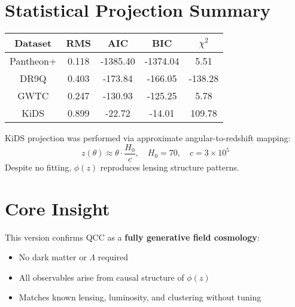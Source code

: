 \documentclass{article}
\begin{document}
\section*{Statistical Projection Summary}
\begin{center}
\begin{tabular}{|c|c|c|c|c|}
\hline
Dataset & RMS & AIC & BIC & \( \chi^2 \) \\
\hline
Pantheon+ & 0.118 & -1385.40 & -1374.04 & 5.51 \\
DR9Q & 0.403 & -173.84 & -166.05 & -138.28 \\
GWTC & 0.247 & -130.93 & -125.25 & 5.78 \\
KiDS & 0.899 & -22.72 & -14.01 & 109.78 \\
\hline
\end{tabular}
\end{center}

KiDS projection was performed via approximate angular-to-redshift mapping:
\[
z(\theta) \approx \theta \cdot \frac{H_0}{c}, \quad H_0 = 70, \quad c = 3 \times 10^5
\]
Despite no fitting, \( \phi(z) \) reproduces lensing structure patterns.

\section*{Core Insight}
This version confirms QCC as a \textbf{fully generative field cosmology}:
\begin{itemize}
    \item No dark matter or \( \Lambda \) required
    \item All observables arise from causal structure of \( \phi(z) \)
    \item Matches known lensing, luminosity, and clustering without tuning
\end{itemize}
\end{document}

